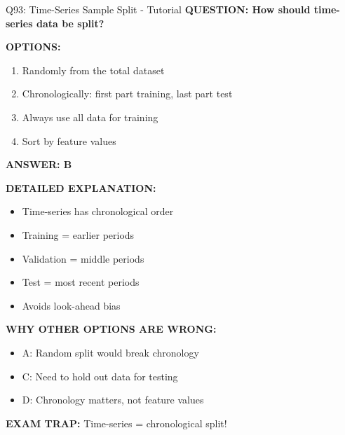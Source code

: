 \documentclass[8pt]{beamer}
\begin{document}
	\begin{frame}{Q93: Time-Series Sample Split - Tutorial}
		\fontsize{6.5}{7.5}\selectfont
		\textbf{QUESTION: How should time-series data be split?}
		
		\vspace{0.1cm}
		\textbf{OPTIONS:}
		\begin{enumerate}
			\item Randomly from the total dataset
			\item Chronologically: first part training, last part test
			\item Always use all data for training
			\item Sort by feature values
		\end{enumerate}
		
		\vspace{0.1cm}
		\textcolor{myblue}{\textbf{ANSWER: B}}
		
		\vspace{0.1cm}
		\textbf{DETAILED EXPLANATION:}
		\begin{itemize}
			\item Time-series has chronological order
			\item Training = earlier periods
			\item Validation = middle periods
			\item Test = most recent periods
			\item Avoids look-ahead bias
		\end{itemize}
		
		\vspace{0.1cm}
		\textcolor{myred}{\textbf{WHY OTHER OPTIONS ARE WRONG:}}
		\begin{itemize}
			\item \textcolor{myred}{A:} Random split would break chronology
			\item \textcolor{myred}{C:} Need to hold out data for testing
			\item \textcolor{myred}{D:} Chronology matters, not feature values
		\end{itemize}
		
		\textcolor{myred}{\textbf{EXAM TRAP:}} Time-series = \textcolor{myblue}{chronological split}!
	\end{frame}
	
\end{document}
